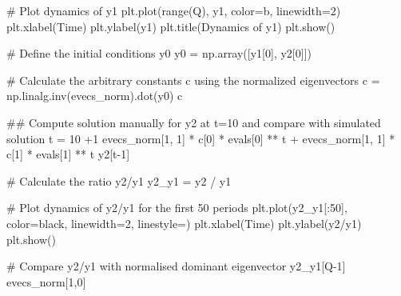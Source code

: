 \documentclass[
  letterpaper,
  DIV=11,
  numbers=noendperiod]{scrreprt}
\newenvironment{Shaded}{\begin{snugshade}}{\end{snugshade}}
\newcommand{\BuiltInTok}[1]{\textcolor[rgb]{0.00,0.23,0.31}{#1}}
\newcommand{\CommentTok}[1]{\textcolor[rgb]{0.37,0.37,0.37}{#1}}
\newcommand{\DecValTok}[1]{\textcolor[rgb]{0.68,0.00,0.00}{#1}}
\newcommand{\NormalTok}[1]{\textcolor[rgb]{0.00,0.23,0.31}{#1}}
\newcommand{\OperatorTok}[1]{\textcolor[rgb]{0.37,0.37,0.37}{#1}}
\newcommand{\StringTok}[1]{\textcolor[rgb]{0.13,0.47,0.30}{#1}}
\begin{document}
\begin{tcolorbox}
\begin{Shaded}
\begin{Highlighting}[]
\CommentTok{\# Plot dynamics of y1}
\NormalTok{plt.plot(}\BuiltInTok{range}\NormalTok{(Q), y1, color}\OperatorTok{=}\StringTok{\textquotesingle{}b\textquotesingle{}}\NormalTok{, linewidth}\OperatorTok{=}\DecValTok{2}\NormalTok{)}
\NormalTok{plt.xlabel(}\StringTok{\textquotesingle{}Time\textquotesingle{}}\NormalTok{)}
\NormalTok{plt.ylabel(}\StringTok{\textquotesingle{}y1\textquotesingle{}}\NormalTok{)}
\NormalTok{plt.title(}\StringTok{\textquotesingle{}Dynamics of y1\textquotesingle{}}\NormalTok{)}
\NormalTok{plt.show()}


\CommentTok{\# Define the initial conditions y0}
\NormalTok{y0 }\OperatorTok{=}\NormalTok{ np.array([y1[}\DecValTok{0}\NormalTok{], y2[}\DecValTok{0}\NormalTok{]])}

\CommentTok{\# Calculate the arbitrary constants c using the normalized eigenvectors}
\NormalTok{c }\OperatorTok{=}\NormalTok{ np.linalg.inv(evecs\_norm).dot(y0)}
\NormalTok{c}

\CommentTok{\#\# Compute solution manually for y2 at t=10 and compare with simulated solution}
\NormalTok{t }\OperatorTok{=} \DecValTok{10} \OperatorTok{+}\DecValTok{1}
\NormalTok{evecs\_norm[}\DecValTok{1}\NormalTok{, }\DecValTok{1}\NormalTok{] }\OperatorTok{*}\NormalTok{ c[}\DecValTok{0}\NormalTok{] }\OperatorTok{*}\NormalTok{ evals[}\DecValTok{0}\NormalTok{] }\OperatorTok{**}\NormalTok{ t }\OperatorTok{+}\NormalTok{ evecs\_norm[}\DecValTok{1}\NormalTok{, }\DecValTok{1}\NormalTok{] }\OperatorTok{*}\NormalTok{ c[}\DecValTok{1}\NormalTok{] }\OperatorTok{*}\NormalTok{ evals[}\DecValTok{1}\NormalTok{] }\OperatorTok{**}\NormalTok{ t}
\NormalTok{y2[t}\OperatorTok{{-}}\DecValTok{1}\NormalTok{]}


\CommentTok{\# Calculate the ratio y2/y1}
\NormalTok{y2\_y1 }\OperatorTok{=}\NormalTok{ y2 }\OperatorTok{/}\NormalTok{ y1}

\CommentTok{\# Plot dynamics of y2/y1 for the first 50 periods}
\NormalTok{plt.plot(y2\_y1[:}\DecValTok{50}\NormalTok{], color}\OperatorTok{=}\StringTok{\textquotesingle{}black\textquotesingle{}}\NormalTok{, linewidth}\OperatorTok{=}\DecValTok{2}\NormalTok{, linestyle}\OperatorTok{=}\StringTok{\textquotesingle{}{-}\textquotesingle{}}\NormalTok{)}
\NormalTok{plt.xlabel(}\StringTok{\textquotesingle{}Time\textquotesingle{}}\NormalTok{)}
\NormalTok{plt.ylabel(}\StringTok{\textquotesingle{}y2/y1\textquotesingle{}}\NormalTok{)}
\NormalTok{plt.show()}

\CommentTok{\# Compare y2/y1 with normalised dominant eigenvector}
\NormalTok{y2\_y1[Q}\OperatorTok{{-}}\DecValTok{1}\NormalTok{]}
\NormalTok{evecs\_norm[}\DecValTok{1}\NormalTok{,}\DecValTok{0}\NormalTok{]}
\end{Highlighting}
\end{Shaded}

\end{tcolorbox}
\end{document}
